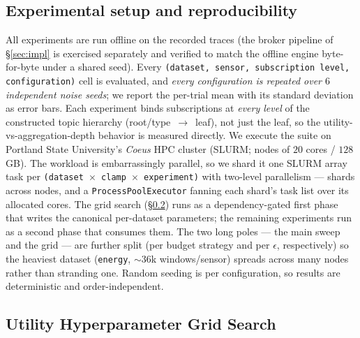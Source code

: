 

\subsection{Experimental setup and reproducibility}
\label{sec:setup}

All experiments are run offline on the recorded traces (the broker pipeline of \S\ref{sec:impl} is exercised separately and verified to match the offline engine byte-for-byte under a shared seed). Every \texttt{(dataset, sensor, subscription level, configuration)} cell is evaluated, and \emph{every configuration is repeated over $6$ independent noise seeds}; we report the per-trial mean with its standard deviation as error bars. Each experiment binds subscriptions at \emph{every level} of the constructed topic hierarchy (root/type~$\to$~leaf), not just the leaf, so the utility-vs-aggregation-depth behavior is measured directly. We execute the suite on Portland State University's \emph{Coeus} HPC cluster (SLURM; nodes of $20$ cores / $128$\,GB). The workload is embarrassingly parallel, so we shard it one SLURM array task per \texttt{(dataset $\times$ clamp $\times$ experiment)} with two-level parallelism --- shards across nodes, and a \texttt{ProcessPoolExecutor} fanning each shard's task list over its allocated cores. The grid search (\S\ref{sec:grid-search}) runs as a dependency-gated first phase that writes the canonical per-dataset parameters; the remaining experiments run as a second phase that consumes them. The two long poles --- the main sweep and the grid --- are further split (per budget strategy and per $\epsilon$, respectively) so the heaviest dataset (\texttt{energy}, $\sim\!36$k windows/sensor) spreads across many nodes rather than stranding one. Random seeding is per configuration, so results are deterministic and order-independent.

\subsection{Utility Hyperparameter Grid Search}
\label{sec:grid-search}

